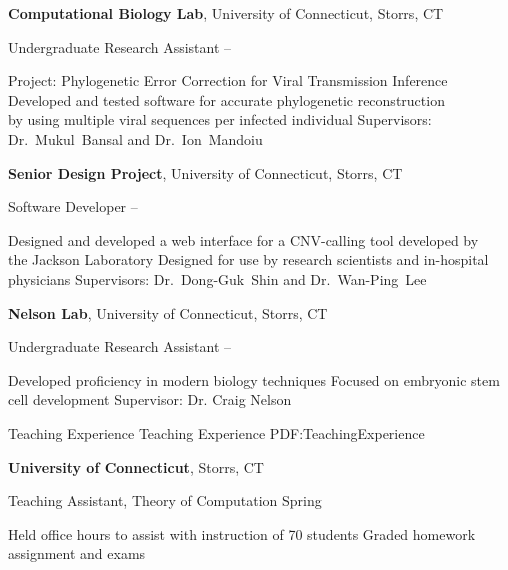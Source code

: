 \documentclass[letterpaper,MMMyyyy,nonstopmode]{simpleresumecv}
\begin{document}
\begin{Body}
\Entry
{\textbf{Computational Biology Lab}},
University of Connecticut, Storrs, CT

\Gap
\BulletItem
Undergraduate Research Assistant
\hfill
{} --
\begin{Detail}
\SubBulletItem
Project:
Phylogenetic Error Correction for Viral Transmission Inference
\SubBulletItem
Developed and tested software for accurate phylogenetic reconstruction\\by using multiple viral sequences per infected individual
\SubBulletItem
Supervisors:
Dr.~Mukul~Bansal and
Dr.~Ion~Mandoiu
\end{Detail}
\BigGap

\Entry
{\textbf{Senior Design Project}},
University of Connecticut, Storrs, CT

\Gap
\BulletItem
Software Developer
\hfill
{} --
\begin{Detail}
\SubBulletItem
Designed and developed a web interface for a CNV-calling tool developed by \\the Jackson Laboratory
\SubBulletItem
Designed for use by research scientists and in-hospital physicians
\SubBulletItem
Supervisors:
Dr.~Dong-Guk~Shin and
Dr.~Wan-Ping~Lee
\end{Detail}
\BigGap

\Entry
{\textbf{Nelson Lab}},
University of Connecticut, Storrs, CT

\Gap
\BulletItem
Undergraduate Research Assistant
\hfill
{} --
\begin{Detail}
\SubBulletItem
Developed proficiency in modern biology techniques
\SubBulletItem
Focused on embryonic stem cell development
\SubBulletItem
Supervisor:
Dr. Craig Nelson
\end{Detail}


\Section
{Teaching Experience}
{Teaching Experience}
{PDF:TeachingExperience}

\Entry
{\textbf{University of Connecticut}}, Storrs, CT

\Gap
\BulletItem
Teaching Assistant, Theory of Computation
\hfill
Spring 
\begin{Detail}
\SubBulletItem
Held office hours to assist with instruction of 70 students
\SubBulletItem
Graded homework assignment and exams
\end{Detail}


\end{Body}
\end{document}
